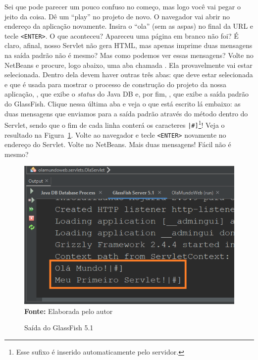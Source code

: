 Sei que pode parecer um pouco confuso no começo, mas logo você vai pegar o jeito da coisa. Dê um ``play'' no projeto de novo. O navegador vai abrir no endereço da aplicação novamente. Insira o ``ola'' (sem as aspas) no final da URL e tecle \texttt{<ENTER>}. O que aconteceu? Apareceu uma página em branco não foi? É claro, afinal, nosso Servlet não gera HTML, mas apenas imprime duas mensagens na saída padrão não é mesmo? Mas como podemos ver essas mensagens? Volte no NetBeans e procure, logo abaixo, uma aba chamada . Ela provavelmente vai estar selecionada. Dentro dela devem haver outras três abas:  que deve estar selecionada e que é usada para mostrar o processo de construção do projeto da nossa aplicação, , que exibe o \textit{status} do Java DB e, por fim, , que exibe a saída padrão do GlassFish. Clique nessa última aba e veja o que está escrito lá embaixo: as duas mensagens que enviamos para a saída padrão através do método  dentro do Servlet, sendo que o fim de cada linha conterá os caracteres \texttt{|\#]}\footnote{Esse sufixo é inserido automaticamente pelo servidor.}! Veja o resultado na Figura~\ref{fig:cap01SaidaGlassFish}. Volte ao navegador e tecle \texttt{<ENTER>} novamente no endereço do Servlet. Volte no NetBeans. Mais duas mensagens! Fácil não é mesmo?

\FloatBarrier
\begin{figure}[!htbp]
    \centering
    \caption{Saída do GlassFish 5.1}
    \includegraphics[scale=0.9]{imagens/cap01SaidaGlassFish}
    \\\textbf{Fonte:} Elaborada pelo autor
    \label{fig:cap01SaidaGlassFish}
\end{figure}
\FloatBarrier
    
